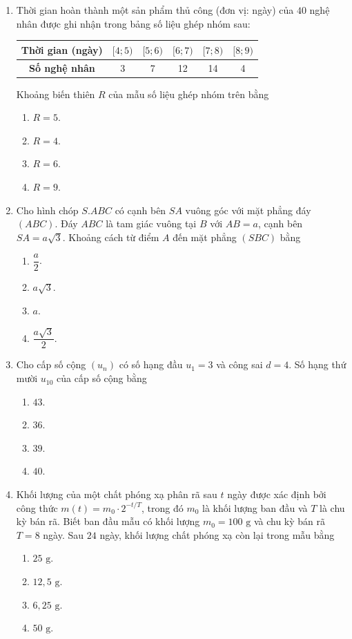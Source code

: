 \documentclass[12pt,a4paper]{article}
\begin{document}
\begin{enumerate}[label=\textbf{Câu \arabic*:}, leftmargin=*]
\item Thời gian hoàn thành một sản phẩm thủ công (đơn vị: ngày) của $40$ nghệ nhân được ghi nhận trong bảng số liệu ghép nhóm sau:
\begin{center}
\begin{tabular}{|c|c|c|c|c|c|}
\hline
\textbf{Thời gian (ngày)} & $[4; 5)$ & $[5; 6)$ & $[6; 7)$ & $[7; 8)$ & $[8; 9)$ \\ \hline
\textbf{Số nghệ nhân} & 3 & 7 & 12 & 14 & 4 \\ \hline
\end{tabular}
\end{center}
Khoảng biến thiên $R$ của mẫu số liệu ghép nhóm trên bằng
\begin{enumerate}[label=\Alph*.]
    \item $R = 5$.
    \item $R = 4$.
    \item $R = 6$.
    \item $R = 9$.
\end{enumerate}

\item Cho hình chóp $S.ABC$ có cạnh bên $SA$ vuông góc với mặt phẳng đáy $(ABC)$. Đáy $ABC$ là tam giác vuông tại $B$ với $AB = a$, cạnh bên $SA = a\sqrt{3}$. Khoảng cách từ điểm $A$ đến mặt phẳng $(SBC)$ bằng
\begin{enumerate}[label=\Alph*.]
    \item $\dfrac{a}{2}$.
    \item $a\sqrt{3}$.
    \item $a$.
    \item $\dfrac{a\sqrt{3}}{2}$.
\end{enumerate}

\item Cho cấp số cộng $(u_n)$ có số hạng đầu $u_1 = 3$ và công sai $d = 4$. Số hạng thứ mười $u_{10}$ của cấp số cộng bằng
\begin{enumerate}[label=\Alph*.]
    \item $43$.
    \item $36$.
    \item $39$.
    \item $40$.
\end{enumerate}

\item Khối lượng của một chất phóng xạ phân rã sau $t$ ngày được xác định bởi công thức $m(t) = m_0 \cdot 2^{-t/T}$, trong đó $m_0$ là khối lượng ban đầu và $T$ là chu kỳ bán rã. Biết ban đầu mẫu có khối lượng $m_0 = 100\text{ g}$ và chu kỳ bán rã $T = 8$ ngày. Sau $24$ ngày, khối lượng chất phóng xạ còn lại trong mẫu bằng
\begin{enumerate}[label=\Alph*.]
    \item $25\text{ g}$.
    \item $12{,}5\text{ g}$.
    \item $6{,}25\text{ g}$.
    \item $50\text{ g}$.
\end{enumerate}


\end{enumerate}
\end{document}
